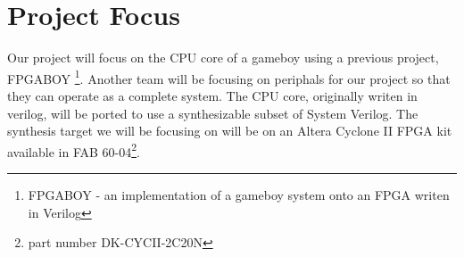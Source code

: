 \section{Project Focus}
Our project will focus on the CPU core of a gameboy using a previous project,
FPGABOY \footnote{FPGABOY - an implementation of a gameboy system onto an FPGA 
writen in Verilog}. Another team will be focusing on periphals for our project 
so that they can operate as a complete system. The CPU core, originally writen 
in verilog, will be ported to use a synthesizable subset of System Verilog.
The synthesis target we will be focusing on will be on an Altera Cyclone II 
FPGA kit available in FAB 60-04\footnote{part number DK-CYCII-2C20N}.


